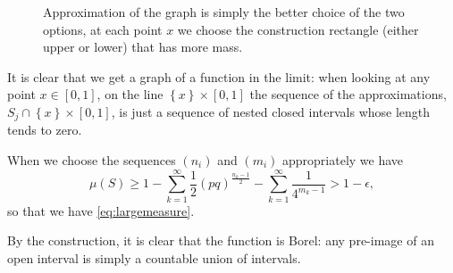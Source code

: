 \documentclass[reqno,12pt]{amsart}
\theoremstyle{plain}
\theoremstyle{remark}
\begin{document}
\begin{figure}
  \begin{center}
  \end{center}
  \caption{Approximation of the graph is simply the better choice of the two options, 
  at each point $x$ we choose the construction rectangle (either upper or lower) that has more mass.}
  \label{fig:apprOfGraph}
\end{figure}

  It is clear that we get a graph of a function in the limit: when looking at any point $x \in [0,1]$,
  on the line $\left\{ x \right\} \times [0,1]$
  the sequence of the approximations, $S_j \cap \left\{ x \right\} \times [0,1] $, 
  is just a sequence of nested closed
  intervals whose length tends to zero.

  When we choose the sequences $(n_i)$ and $(m_i)$ appropriately we have
  \[
    \mu(S) \ge 1 - \sum_{k=1}^\infty\frac12(pq)^{\frac{n_k-1}{2}} - \sum_{k=1}^\infty\frac{1}{4^{m_k-1}} > 1-\epsilon,
  \]
  so that we have \eqref{eq:largemeasure}.

  By the construction, it is clear that the function is Borel: any pre-image of an open interval is simply a countable union of
  intervals.
\end{document}
